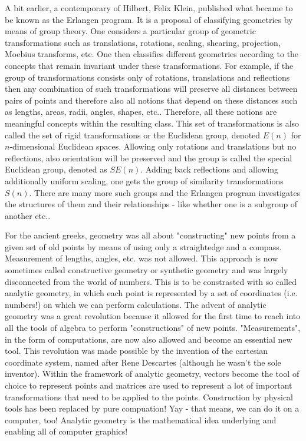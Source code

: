 \medskip
A bit earlier, a contemporary of Hilbert, Felix Klein, published what became to be known as the Erlangen program. It is a proposal of classifying geometries by means of group theory. One considers a particular group of geometric transformations such as translations, rotations, scaling, shearing, projection, Moebius transforms, etc. One then classifies different geometries according to the concepts that remain invariant under these transformations. For example, if the group of transformations consists only of rotations, translations and reflections then any combination of such transformations will preserve all distances between pairs of points and therefore also all notions that depend on these distances such as lengths, areas, radii, angles, shapes, etc.. Therefore, all these notions are meaningful concepts within the resulting class. This set of transformations is also called the set of rigid transformations or the Euclidean group, denoted $E(n)$ for $n$-dimensional Euclidean spaces. Allowing only rotations and translations but no reflections, also orientation will be preserved and the group is called the special Euclidean group, denoted as $SE(n)$. Adding back reflections and allowing additionally uniform scaling, one gets the group of similarity transformations $S(n)$. There are many more such groups and the Erlangen program investigates the structures of them and their relationships - like whether one is a subgroup of another etc..

\medskip
For the ancient greeks, geometry was all about "constructing" new points from a given set of old points by means of using only a straightedge and a compass. Measurement of lengths, angles, etc. was not allowed. This approach is now sometimes called constructive geometry or synthetic geometry and was largely disconnected from the world of numbers. This is to be constrasted with so called analytic geometry, in which each point is represented by a set of coordinates (i.e. numbers!) on which we can perform calculations. The advent of analytic geometry was a great revolution because it allowed for the first time to reach into all the tools of algebra to perform "constructions" of new points. "Measurements", in the form of computations, are now also allowed and become an essential new tool. This revolution was made possible by the invention of the cartesian coordinate system, named after Rene Descartes (although he wasn't the sole inventor). Within the framework of analytic geometry, vectors become the tool of choice to represent points and matrices are used to represent a lot of important transformations that need to be applied to the points. Construction by physical tools has been replaced by pure compuation! Yay - that means, we can do it on a computer, too! Analytic geometry is the mathematical idea underlying and enabling all of computer graphics!


